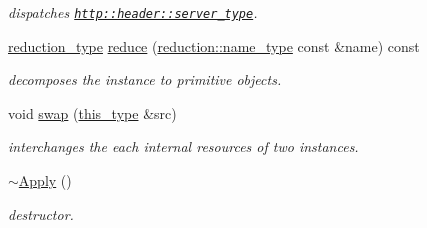\begin{DoxyCompactItemize}
\begin{DoxyCompactList}\small\item\em dispatches \href{http::header::server_type}{\tt http\-::header\-::server\-\_\-type}. \end{DoxyCompactList}\item 
\hypertarget{classhryky_1_1http_1_1header_1_1field_1_1dispatcher_1_1_apply_a4b95cdfc2895ff18945b8ef6814dd180}{\hyperlink{namespacehryky_a343a9a4c36a586be5c2693156200eadc}{reduction\-\_\-type} \hyperlink{classhryky_1_1http_1_1header_1_1field_1_1dispatcher_1_1_apply_a4b95cdfc2895ff18945b8ef6814dd180}{reduce} (\hyperlink{namespacehryky_1_1reduction_ac686c30a4c8d196bbd0f05629a6b921f}{reduction\-::name\-\_\-type} const \&name) const }\label{classhryky_1_1http_1_1header_1_1field_1_1dispatcher_1_1_apply_a4b95cdfc2895ff18945b8ef6814dd180}

\begin{DoxyCompactList}\small\item\em decomposes the instance to primitive objects. \end{DoxyCompactList}\item 
\hypertarget{classhryky_1_1http_1_1header_1_1field_1_1dispatcher_1_1_apply_a7202365f1b4e8a0f76efbcc0aaf4f091}{void \hyperlink{classhryky_1_1http_1_1header_1_1field_1_1dispatcher_1_1_apply_a7202365f1b4e8a0f76efbcc0aaf4f091}{swap} (\hyperlink{classhryky_1_1http_1_1header_1_1field_1_1dispatcher_1_1_apply_a4d2826be199b8c44304035ecb71c4ccd}{this\-\_\-type} \&src)}\label{classhryky_1_1http_1_1header_1_1field_1_1dispatcher_1_1_apply_a7202365f1b4e8a0f76efbcc0aaf4f091}

\begin{DoxyCompactList}\small\item\em interchanges the each internal resources of two instances. \end{DoxyCompactList}\item 
\hypertarget{classhryky_1_1http_1_1header_1_1field_1_1dispatcher_1_1_apply_af08ab30197400a00bf50a7ecb90a6dfe}{\hyperlink{classhryky_1_1http_1_1header_1_1field_1_1dispatcher_1_1_apply_af08ab30197400a00bf50a7ecb90a6dfe}{$\sim$\-Apply} ()}\label{classhryky_1_1http_1_1header_1_1field_1_1dispatcher_1_1_apply_af08ab30197400a00bf50a7ecb90a6dfe}

\begin{DoxyCompactList}\small\item\em destructor. \end{DoxyCompactList}\end{DoxyCompactItemize}
